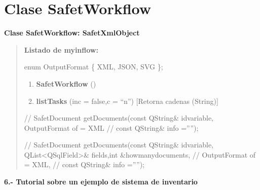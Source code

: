 \documentclass[letterpaper,11pt,spanish]{sphinxmanual}
\begin{document}
\chapter{Clase SafetWorkflow}
\label{_templates/Contenido5/Clase6:clase-safetworkflow}\label{_templates/Contenido5/Clase6::doc}
\textbf{Clase SafetWorkflow: SafetXmlObject}
\begin{quote}

\textbf{Listado de myinflow:}

enum OutputFormat \{ XML, JSON, SVG \};
\begin{enumerate}
\item {} 
\textbf{SafetWorkflow} ()

\item {} 
\textbf{listTasks} (inc = false,c = ``n'') {[}Retorna cadenas (String){]}

\end{enumerate}

//    SafetDocument getDocuments(const QString\& idvariable, OutputFormat of = XML
//                         const QString\& info ='''');

//    SafetDocument getDocuments(const QString\& idvariable, QList\textless{}QSqlField\textgreater{}\& fields,int \&howmanydocuments,
//                         OutputFormat of = XML,
//                         const QString\& info ='''');
\end{quote}

\textbf{6.- Tutorial sobre un ejemplo de sistema de inventario}
\end{document}
